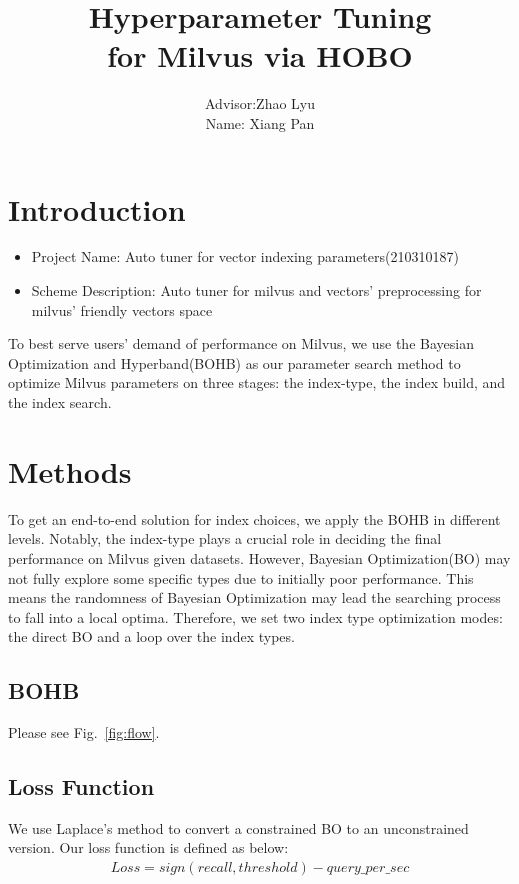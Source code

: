 \documentclass{ol-softwaremanual}
\title{Hyperparameter Tuning \\for Milvus via HOBO}
\author{Advisor:Zhao Lyu\\ Name:   Xiang Pan}
\begin{document}
\maketitle

\tableofcontents
\newpage

\section{Introduction}

\begin{itemize}
    \item Project Name: Auto tuner for vector indexing parameters(210310187)
    \item Scheme Description: Auto tuner for milvus and vectors' preprocessing for milvus' friendly vectors space
\end{itemize}

To best serve users' demand of performance on Milvus, we use the Bayesian Optimization and Hyperband(BOHB)\cite{falkner__BOHBRobustEfficient} as our parameter search method to optimize Milvus parameters on three stages: the index-type, the index build, and the index search.

\section{Methods}
To get an end-to-end solution for index choices, we apply the BOHB in different levels. Notably, the index-type plays a crucial role in deciding the final performance on Milvus given datasets. However, Bayesian Optimization(BO) may not fully explore some specific types due to initially poor performance. This means the randomness of Bayesian Optimization may lead the searching process to fall into a local optima. Therefore, we set two index type optimization modes: the direct BO and a loop over the index types.

\subsection{BOHB}
Please see Fig.~\ref{fig:flow}.

\subsection{Loss Function}

We use Laplace's method to convert a constrained BO to an unconstrained version.
Our loss function is defined as below:  
\begin{align}
Loss = sign(recall, threshold) - query\_per\_sec 
\end{align}
\end{document}
